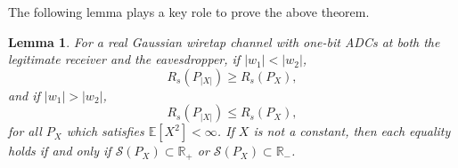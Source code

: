 \documentclass[journal]{IEEEtran}
\newtheorem{lemma}[theorem]{Lemma}
\begin{document}
The following lemma plays a key role to prove the above theorem. 
\begin{lemma} \label{Lem:folded}  
For a real Gaussian wiretap channel with one-bit ADCs at both the legitimate receiver and the eavesdropper, if $|w_1|<|w_2|$,
\begin{equation}
 R_s \left( P_{|X|} \right) \geq R_s(P_X), \label{eq:Lem5.2_1}
\end{equation}
 and if $|w_1|>|w_2|$,
\begin{equation}
 R_s \left( P_{|X|} \right) \leq R_s(P_X), \label{eq:Lem5.2_2}
\end{equation}
 for all $P_X$ which satisfies ${\mathbb{E}[X^2]<\infty}$. If $X$ is not a constant, then each equality holds if and only if $\mathcal{S}(P_X) \subset \mathbb{R}_+$ or ${\mathcal{S}(P_X) \subset \mathbb{R}_-}$.
\end{lemma}
\end{document}
